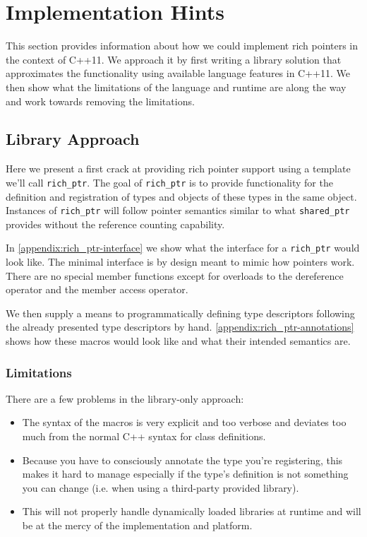 \section{Implementation Hints}

This section provides information about how we could implement rich pointers in the context of C++11. We approach it by first writing a library solution that approximates the functionality using available language features in C++11. We then show what the limitations of the language and runtime are along the way and work towards removing the limitations.

\subsection{Library Approach}

Here we present a first crack at providing rich pointer support using a template we'll call \verb+rich_ptr+. The goal of \verb+rich_ptr+ is to provide functionality for the definition and registration of types and objects of these types in the same object. Instances of \verb+rich_ptr+ will follow pointer semantics similar to what \verb+shared_ptr+ provides without the reference counting capability.

In \autoref{appendix:rich_ptr-interface} we show what the interface for a \verb+rich_ptr+ would look like. The minimal interface is by design meant to mimic how pointers work. There are no special member functions except for overloads to the dereference operator and the member access operator.

We then supply a means to programmatically defining type descriptors following the already presented type descriptors by hand. \autoref{appendix:rich_ptr-annotations} shows how these macros would look like and what their intended semantics are.

\subsubsection{Limitations}

There are a few problems in the library-only approach:

\begin{itemize}
	\item The syntax of the macros is very explicit and too verbose and deviates too much from the normal C++ syntax for class definitions.
	\item Because you have to consciously annotate the type you’re registering, this makes it hard to manage especially if the type’s definition is not something you can change (i.e. when using a third-party provided library).
	\item This will not properly handle dynamically loaded libraries at runtime and will be at the mercy of the implementation and platform.
\end{itemize}

